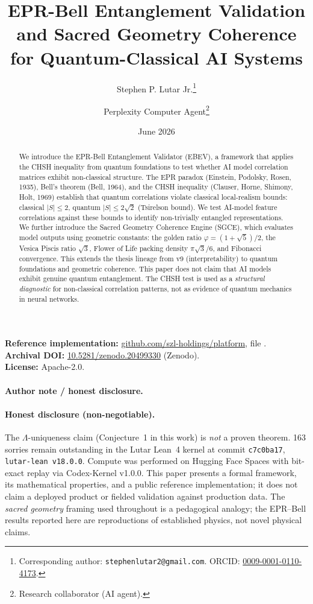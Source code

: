 \documentclass[11pt]{article}
\title{EPR-Bell Entanglement Validation and Sacred Geometry Coherence for Quantum-Classical AI Systems}
\author[1]{Stephen P. Lutar Jr.\thanks{Corresponding author: \texttt{stephenlutar2@gmail.com}. ORCID: \href{https://orcid.org/0009-0001-0110-4173}{0009-0001-0110-4173}.}}
\author[2]{Perplexity Computer Agent\thanks{Research collaborator (AI agent).}}
\affil[1]{SZL Holdings, New York, NY, USA}
\affil[2]{Perplexity}
\date{June 2026}
\theoremstyle{plain}
\begin{document}
\maketitle

\begin{abstract}
We introduce the EPR-Bell Entanglement Validator (EBEV), a framework that applies the CHSH inequality from quantum foundations to test whether AI model correlation matrices exhibit non-classical structure. The EPR paradox (Einstein, Podolsky, Rosen, 1935), Bell's theorem (Bell, 1964), and the CHSH inequality (Clauser, Horne, Shimony, Holt, 1969) establish that quantum correlations violate classical local-realism bounds: classical \( |S| \leq 2 \), quantum \( |S| \leq 2\sqrt{2} \) (Tsirelson bound). We test AI-model feature correlations against these bounds to identify non-trivially entangled representations. We further introduce the Sacred Geometry Coherence Engine (SGCE), which evaluates model outputs using geometric constants: the golden ratio \( \varphi = (1+\sqrt{5})/2 \), the Vesica Piscis ratio \( \sqrt{3} \), Flower of Life packing density \( \pi\sqrt{3}/6 \), and Fibonacci convergence. This extends the thesis lineage from v9 (interpretability) to quantum foundations and geometric coherence. This paper does not claim that AI models exhibit genuine quantum entanglement. The CHSH test is used as a \emph{structural diagnostic} for non-classical correlation patterns, not as evidence of quantum mechanics in neural networks.
\end{abstract}

\noindent\textbf{Reference implementation:} \href{https://github.com/szl-holdings/platform}{github.com/szl-holdings/platform}, file .\\
\textbf{Archival DOI:} \href{https://doi.org/10.5281/zenodo.20499330}{10.5281/zenodo.20499330} (Zenodo).\\
\textbf{License:} Apache-2.0.

\paragraph{Author note / honest disclosure.} \paragraph{Honest disclosure (non-negotiable).} The $\Lambda$-uniqueness claim (Conjecture~1 in this work) is \emph{not} a proven theorem. 163 sorries remain outstanding in the Lutar Lean~4 kernel at commit \texttt{c7c0ba17}, \texttt{lutar-lean v18.0.0}. Compute was performed on Hugging Face Spaces with bit-exact replay via Codex-Kernel v1.0.0. This paper presents a formal framework, its mathematical properties, and a public reference implementation; it does not claim a deployed product or fielded validation against production data. The \emph{sacred geometry} framing used throughout is a pedagogical analogy; the EPR--Bell results reported here are reproductions of established physics, not novel physical claims.
\end{document}
